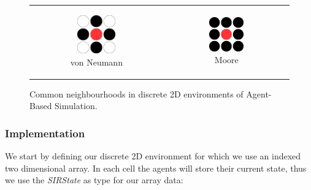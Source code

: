 \begin{figure}
\begin{center}
	\begin{tabular}{c c}
		\begin{subfigure}[b]{0.3\textwidth}
			\centering
			\includegraphics[width=0.5\textwidth, angle=0]{./fig/diagrams/neumann.png}
			\caption{von Neumann}
			\label{fig:neumann_neighbourhood}
		\end{subfigure}
    	&
		\begin{subfigure}[b]{0.3\textwidth}
			\centering
			\includegraphics[width=0.5\textwidth, angle=0]{./fig/diagrams/moore.png}
			\caption{Moore}
			\label{fig:moore_neighbourhood}
		\end{subfigure}
    \end{tabular}
	\caption{Common neighbourhoods in discrete 2D environments of Agent-Based Simulation.}
	\label{fig:abs_neighbourhoods}
\end{center}
\end{figure}

\subsubsection{Implementation}
We start by defining our discrete 2D environment for which we use an indexed two dimensional array. In each cell the agents will store their current state, thus we use the \textit{SIRState} as type for our array data:

